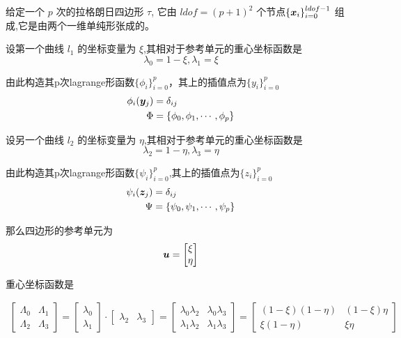 \documentclass{article}
\begin{document}
给定一个 $p$ 次的拉格朗日四边形 $\tau$, 它由 $ldof = (p+1)^2 $ 个节点$\{{\boldsymbol x}_i\}_{i=0}^{ldof-1}$ 组成,它是由两个一维单纯形张成的。

设第一个曲线 $l_1$ 的坐标变量为 $ \xi $,其相对于参考单元的重心坐标函数是
$$
\lambda_0 = 1- \xi , \lambda_1 = \xi
$$

由此构造其p次lagrange形函数$\{\phi_i\}_{i=0}^{p}$，其上的插值点为$\{y_i\}_{i=0}^{p}$
\begin{align*}
\phi_i({\boldsymbol y}_j) &= \delta_{ij} \\
\Phi &= \{ \phi_0 , \phi_1 , \cdots ,\phi_p \}
\end{align*}

设另一个曲线 $l_2$ 的坐标变量为 $ \eta $,其相对于参考单元的重心坐标函数是
$$
\lambda_2 = 1- \eta , \lambda_3 = \eta
$$

由此构造其p次lagrange形函数$\{\psi_i\}_{i=0}^{p}$,其上的插值点为$\{z_i\}_{i=0}^{p}$
\begin{align*}
\psi_i({\boldsymbol z}_j) &= \delta_{ij} \\
\Psi &= \{ \psi_0 , \psi_1 , \cdots ,\psi_p \}
\end{align*}



那么四边形的参考单元为
$$
 {\boldsymbol u} = \begin{bmatrix}
        	\xi \\ \eta
 		\end{bmatrix}
$$

重心坐标函数是

\begin{align*}
	\begin{bmatrix}
		\Lambda_0 & \Lambda_1 \\
		\Lambda_2 & \Lambda_3
	\end{bmatrix}
	=
     \begin{bmatrix}
       \lambda_0  \\ \lambda_1
    \end{bmatrix}
  	\cdot
    \begin{bmatrix}
        \lambda_2 & \lambda_3
    \end{bmatrix}
    =
    \begin{bmatrix}
        \lambda_0 \lambda_2 & \lambda_0 \lambda_3 \\
        \lambda_1 \lambda_2 & \lambda_1 \lambda_3
    \end{bmatrix}
    =
	\begin{bmatrix}
    	(1 - \xi )(1 - \eta ) & (1 - \xi ) \eta \\
    	\xi (1 - \eta)       & \xi \eta	
    \end{bmatrix}   
\end{align*}
\end{document}
